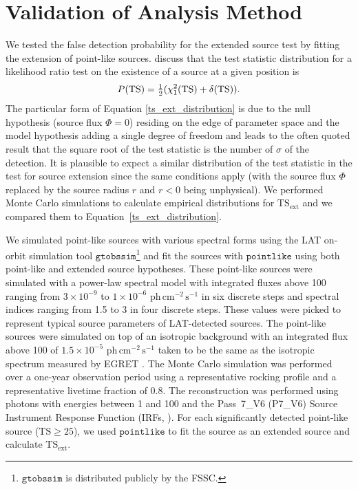 \documentclass[12pt,preprint]{aastex}
\newcommand{\mev}{\text{MeV}\xspace}
\newcommand{\gev}{\text{GeV}\xspace}
\newcommand{\phflux}{\ensuremath{\text{ph}\,\text{cm}^{-2}\,\text{s}^{-1}}\xspace}
\newcommand{\tsext}{{\ensuremath{\text{TS}_{\text{ext}}}}\xspace}
\newcommand{\ts}{\text{TS}\xspace}
\newcommand{\pointlike}{\ensuremath{\mathtt{pointlike}}\xspace}
\newcommand{\gtobssim}{\ensuremath{\mathtt{gtobssim}}\xspace}
\begin{document}
\section{Validation of Analysis Method}

\label{monte_carlo_validation}

We tested the false detection probability for the extended source test
by fitting the extension of point-like sources.  \cite{mattox_egret}
discuss that the test statistic distribution for a likelihood ratio test
on the existence of a source at a given position is
\begin{equation}\label{ts_ext_distribution}
  P(\ts)=\onehalf(\chi^2_1(\ts)+\delta(\ts)).
\end{equation}
The particular form of Equation \ref{ts_ext_distribution} is due to the
null hypothesis (source flux $\Phi=0$) residing on the edge of parameter
space and the model hypothesis adding a single degree of freedom and
leads to the often quoted result that the square root of the test
statistic is the number of $\sigma$ of the detection. It is plausible
to expect a similar distribution of the test statistic in the test for
source extension since the same conditions apply (with the source flux
$\Phi$ replaced by the source radius $r$ and $r<0$ being unphysical).
We performed Monte Carlo simulations to calculate empirical distributions
for $\tsext$ and we compared them to Equation~\ref{ts_ext_distribution}.

We simulated point-like sources with various spectral forms using
the LAT on-orbit simulation tool
\gtobssim\footnote{\gtobssim is distributed publicly by the FSSC.} and fit the sources
with \pointlike using both point-like
and extended source hypotheses.  These point-like sources were simulated with a power-law
spectral model with integrated fluxes above 100 \mev ranging from $3\times10^{-9}$ 
to $1\times10^{-6}$ \phflux in six discrete steps and spectral
indices ranging from 1.5 to 3 in four discrete steps.  These values
were picked to represent typical source parameters of LAT-detected
sources. The point-like sources were simulated on top of an isotropic
background with an integrated flux above 100 \mev of $1.5\times10^{-5}$ \phflux
taken to be the same as the isotropic spectrum measured by EGRET
\citep{sreekumar_isotropic}.  The Monte Carlo simulation was performed
over a one-year observation period using a representative rocking profile and a
representative livetime fraction of 0.8.  The reconstruction was performed
using photons with energies between 1 \gev and 100 \gev 
and the Pass~7\_V6 (P7\_V6) Source Instrument
Response Function (IRFs, \cite{lat_on_orbit_psf}).  For each 
significantly detected point-like source ($\ts\ge25$), we used \pointlike
to fit the source as an extended source and calculate \tsext.
\end{document}
